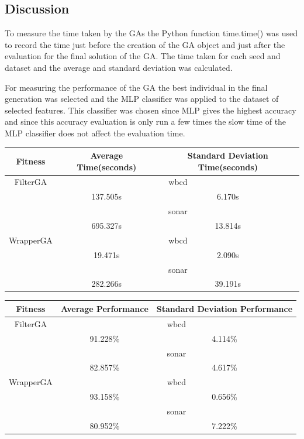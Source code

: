 \documentclass{article}
\begin{document}
\subsection*{Discussion}
To measure the time taken by the GAs the Python function time.time() was used to record the time just before the creation of the GA object and just after the evaluation for the final solution of the GA. The time taken for each seed and dataset and the average and standard deviation was calculated. \par
\noindent For measuring the performance of the GA the best individual in the final generation was selected and the MLP classifier was applied to the dataset of selected features. This classifier was chosen since MLP gives the highest accuracy and since this accuracy evaluation is only run a few times the slow time of the MLP classifier does not affect the evaluation time. 
\begin{center}
\begin{tabular}{|c|c|c|}
\hline
Fitness & Average Time(seconds) & Standard Deviation Time(seconds) \\
\hline
FilterGA & \multicolumn{2}{c|}{wbcd} \\
\hline
& 137.505s & 6.170s \\
\hline
& \multicolumn{2}{c|}{sonar} \\
\hline
& 695.327s & 13.814s \\
\hline
WrapperGA & \multicolumn{2}{c|}{wbcd} \\
\hline
& 19.471s & 2.090s \\
\hline
& \multicolumn{2}{c|}{sonar} \\
\hline
& 282.266s & 39.191s \\
\hline
\end{tabular}
\begin{tabular}{|c|c|c|}
\hline
Fitness & Average Performance & Standard Deviation Performance \\
\hline
FilterGA & \multicolumn{2}{c|}{wbcd} \\
\hline
& 91.228\% & 4.114\% \\
\hline
& \multicolumn{2}{c|}{sonar} \\
\hline
& 82.857\% & 4.617\% \\
\hline
WrapperGA & \multicolumn{2}{c|}{wbcd} \\
\hline
& 93.158\% & 0.656\% \\
\hline
& \multicolumn{2}{c|}{sonar} \\
\hline
& 80.952\% & 7.222\% \\
\hline
\end{tabular}
\end{center}
\end{document}
